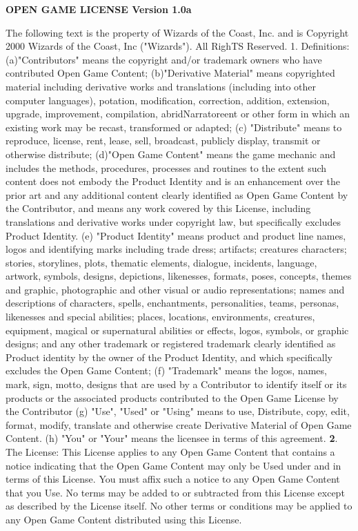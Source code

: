 \documentclass[a4paper,11pt,twoside,openany]{book}
\begin{document}
{\footnotesize
\textbf{OPEN GAME LICENSE Version 1.0a}

The following text is the property of Wizards of the Coast, Inc. and is Copyright 2000 Wizards of the Coast, Inc ("Wizards"). All RighTS Reserved.
1. Definitions: (a)"Contributors" means the copyright and/or trademark owners who have contributed Open Game Content; (b)"Derivative Material" means copyrighted material including derivative works and translations (including into other computer languages), potation, modification, correction, addition, extension, upgrade, improvement, compilation, abridNarratoreent or other form in which an existing work may be recast, transformed or adapted; (c) "Distribute" means to reproduce, license, rent, lease, sell, broadcast, publicly display, transmit or otherwise distribute; (d)"Open Game Content" means the game mechanic and includes the methods, procedures, processes and routines to the extent such content does not embody the Product Identity and is an enhancement over the prior art and any additional content clearly identified as Open Game Content by the Contributor, and means any work covered by this License, including translations and derivative works under copyright law, but specifically excludes Product Identity. (e) "Product Identity" means product and product line names, logos and identifying marks including trade dress; artifacts; creatures characters; stories, storylines, plots, thematic elements, dialogue, incidents, language, artwork, symbols, designs, depictions, likenesses, formats, poses, concepts, themes and graphic, photographic and other visual or audio representations; names and descriptions of characters, spells, enchantments, personalities, teams, personas, likenesses and special abilities; places, locations, environments, creatures, equipment, magical or supernatural abilities or effects, logos, symbols, or graphic designs; and any other trademark or registered trademark clearly identified as Product identity by the owner of the Product Identity, and which specifically excludes the Open Game Content; (f) "Trademark" means the logos, names, mark, sign, motto, designs that are used by a Contributor to identify itself or its products or the associated products contributed to the Open Game License by the Contributor (g) "Use", "Used" or "Using" means to use, Distribute, copy, edit, format, modify, translate and otherwise create Derivative Material of Open Game Content. (h) "You" or "Your" means the licensee in terms of this agreement.
\textbf{2}. The License: This License applies to any Open Game Content that contains a notice indicating that the Open Game Content may only be Used under and in terms of this License. You must affix such a notice to any Open Game Content that you Use. No terms may be added to or subtracted from this License except as described by the License itself. No other terms or conditions may be applied to any Open Game Content distributed using this License.
}
\end{document}
